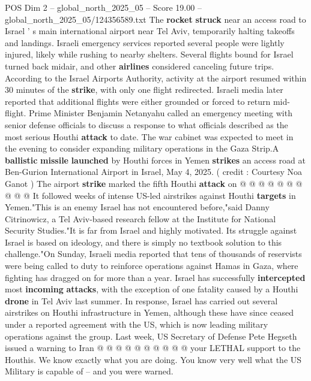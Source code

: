 \begin{textsample}{POS Dim 2 – global\_north\_2025\_05 – Score 19.00 – global\_north\_2025\_05/124356589.txt}  \label{ex:f2_pos_405}
The \textbf{rocket} \textbf{struck} near an access road to Israel ' s main international airport near Tel Aviv, temporarily halting takeoffs and landings.
Israeli emergency services reported several people were lightly injured, likely while rushing to nearby shelters.
Several flights bound for Israel turned back midair, and other \textbf{airlines} considered canceling future trips.
According to the Israel Airports Authority, activity at the airport resumed within 30 minutes of the \textbf{strike}, with only one flight redirected.
Israeli media later reported that additional flights were either grounded or forced to return mid-flight.
Prime Minister Benjamin Netanyahu called an emergency meeting with senior defense officials to discuss a response to what officials described as the most serious Houthi \textbf{attack} to date.
The war cabinet was expected to meet in the evening to consider expanding military operations in the Gaza Strip.A \textbf{ballistic} \textbf{missile} \textbf{launched} by Houthi forces in Yemen \textbf{strikes} an access road at Ben-Gurion International Airport in Israel, May 4, 2025. ( credit : Courtesy Noa Ganot ) The airport \textbf{strike} marked the fifth Houthi \textbf{attack} on @ @ @ @ @ @ @ @ @ @ It followed weeks of intense US-led airstrikes against Houthi \textbf{targets} in Yemen."This is an enemy Israel has not encountered before,"said Danny Citrinowicz, a Tel Aviv-based research fellow at the Institute for National Security Studies."It is far from Israel and highly motivated.
Its struggle against Israel is based on ideology, and there is simply no textbook solution to this challenge."On Sunday, Israeli media reported that tens of thousands of reservists were being called to duty to reinforce operations against Hamas in Gaza, where fighting has dragged on for more than a year.
Israel has successfully \textbf{intercepted} most \textbf{incoming} \textbf{attacks}, with the exception of one fatality caused by a Houthi \textbf{drone} in Tel Aviv last summer.
In response, Israel has carried out several airstrikes on Houthi infrastructure in Yemen, although these have since ceased under a reported agreement with the US, which is now leading military operations against the group.
Last week, US Secretary of Defense Pete Hegseth issued a warning to Iran @ @ @ @ @ @ @ @ @ @ your LETHAL support to the Houthis.
We know exactly what you are doing.
You know very well what the US Military is capable of -- and you were warned.

\end{textsample}
